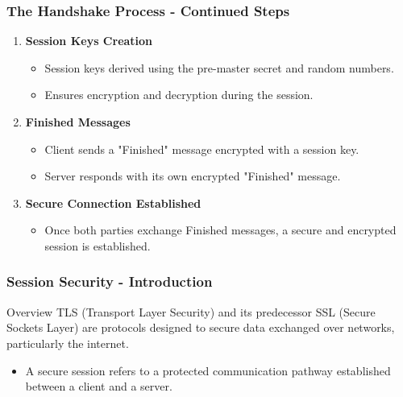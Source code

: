 \documentclass{beamer}
\begin{document}
\begin{frame}[fragile]
    \frametitle{The Handshake Process - Continued Steps}
    \begin{enumerate}[resume]
        \item \textbf{Session Keys Creation}
        \begin{itemize}
            \item Session keys derived using the pre-master secret and random numbers.
            \item Ensures encryption and decryption during the session.
        \end{itemize}

        \item \textbf{Finished Messages}
        \begin{itemize}
            \item Client sends a "Finished" message encrypted with a session key.
            \item Server responds with its own encrypted "Finished" message.
        \end{itemize}

        \item \textbf{Secure Connection Established}
        \begin{itemize}
            \item Once both parties exchange Finished messages, a secure and encrypted session is established.
        \end{itemize}
    \end{enumerate}
\end{frame}

\begin{frame}[fragile]
    \frametitle{Session Security - Introduction}
    \begin{block}{Overview}
        TLS (Transport Layer Security) and its predecessor SSL (Secure Sockets Layer) are protocols designed to secure data exchanged over networks, particularly the internet. 
    \end{block}
    \begin{itemize}
        \item A secure session refers to a protected communication pathway established between a client and a server.
    \end{itemize}
\end{frame}
\end{document}

